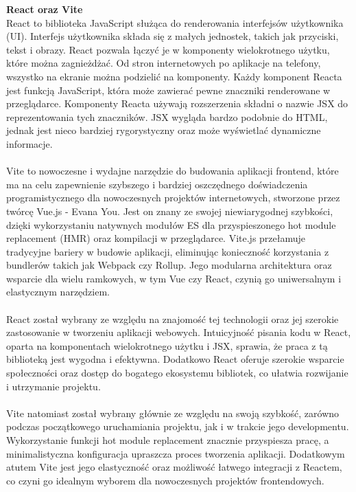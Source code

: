 \documentclass[twoside]{projektInzynierskiMS1}
\begin{document}
\noindent \textbf{React oraz Vite}\\
React to biblioteka JavaScript służąca do renderowania interfejsów użytkownika (UI). Interfejs użytkownika składa się z małych jednostek, takich jak przyciski, tekst i obrazy. React pozwala łączyć je w komponenty wielokrotnego użytku, które można zagnieżdżać. Od stron internetowych po aplikacje na telefony, wszystko na ekranie można podzielić na komponenty. Każdy komponent Reacta jest funkcją JavaScript, która może zawierać pewne znaczniki renderowane w przeglądarce. Komponenty Reacta używają rozszerzenia składni o nazwie JSX do reprezentowania tych znaczników. JSX wygląda bardzo podobnie do HTML, jednak jest nieco bardziej rygorystyczny oraz może wyświetlać dynamiczne informacje. 
\\\\
Vite to nowoczesne i wydajne  narzędzie do budowania aplikacji frontend, które ma na celu zapewnienie szybszego i bardziej oszczędnego doświadczenia programistycznego dla nowoczesnych projektów internetowych, stworzone przez twórcę Vue.js - Evana You. Jest on znany ze swojej niewiarygodnej szybkości, dzięki wykorzystaniu natywnych modułów ES dla przyspieszonego hot module replacement (HMR) oraz kompilacji w przeglądarce. Vite.js przełamuje tradycyjne bariery w budowie aplikacji, eliminując konieczność korzystania z bundlerów takich jak Webpack czy Rollup. Jego modularna architektura oraz wsparcie dla wielu ramkowych, w tym Vue czy React, czynią go uniwersalnym i elastycznym narzędziem.
\\\\
React został wybrany ze względu na znajomość tej technologii oraz jej szerokie zastosowanie w tworzeniu aplikacji webowych. Intuicyjność pisania kodu w React, oparta na komponentach wielokrotnego użytku i JSX, sprawia, że praca z tą biblioteką jest wygodna i efektywna. Dodatkowo React oferuje szerokie wsparcie społeczności oraz dostęp do bogatego ekosystemu bibliotek, co ułatwia rozwijanie i utrzymanie projektu.
\\\\
Vite natomiast został wybrany głównie ze względu na swoją szybkość, zarówno podczas początkowego uruchamiania projektu, jak i w trakcie jego developmentu. Wykorzystanie funkcji hot module replacement znacznie przyspiesza pracę, a minimalistyczna konfiguracja upraszcza proces tworzenia aplikacji. Dodatkowym atutem Vite jest jego elastyczność oraz możliwość łatwego integracji z Reactem, co czyni go idealnym wyborem dla nowoczesnych projektów frontendowych.
\\\\
\end{document}
